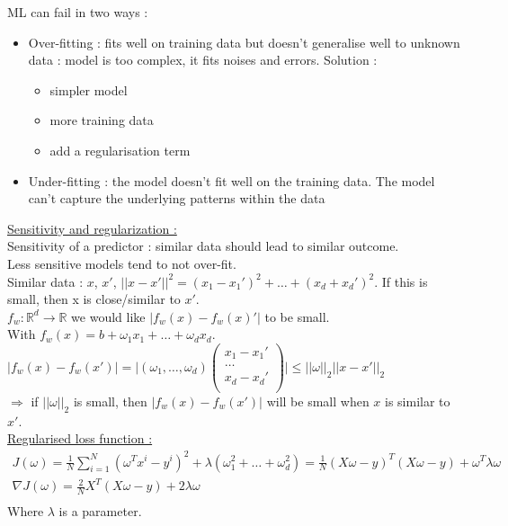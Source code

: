 \documentclass[../main.tex]{subfiles}
\begin{document}
ML can fail in two ways : \begin{itemize}
    \item Over-fitting : fits well on training data but doesn't generalise well to unknown data : model is too complex, it fits noises and errors. Solution : \begin{itemize}
        \item simpler model\\
        \item more training data\\
        \item add a regularisation term\\
    \end{itemize}
    \item Under-fitting : the model doesn't fit well on the training data. The model can't capture the underlying patterns within the data\\
\end{itemize}

\quad \underline{Sensitivity and regularization :}\\
Sensitivity of a predictor : similar data should lead to similar outcome.\\
Less sensitive models tend to not over-fit.\\
Similar data : $x$, $x'$, $\lvert \lvert x-x'\rvert \rvert^2 = (x_1-x_1')^2+ \dots + (x_d+x_d')^2$. If this is small, then x is close/similar to $x'$. \\
$f_w : \mathbb{R}^d\rightarrow \mathbb{R}$ we would like $\lvert f_w(x) - f_w(x)'\rvert$ to be small.\\
With $f_w(x) = b+\omega_1x_1 + \dots + \omega_dx_d$.\\
$\lvert f_w(x) - f_w(x')\rvert = \lvert (\omega_1, \dots, \omega_d) \begin{pmatrix}
    x_1-x_1'\\ \dots \\ x_d-x_d'\\
\end{pmatrix} \rvert \leq \lvert \lvert\omega \rvert \rvert_2 \lvert \lvert x-x'\rvert \rvert_2$\\
$\Rightarrow$ if $\lvert \lvert \omega\rvert \rvert_2$ is small, then $\lvert f_w(x)-f_w(x')\rvert$ will be small when $x$ is similar to $x'$.\\

\quad \underline{Regularised loss function :}\\
\begin{equation}
\begin{gathered}
    J(\omega) = \frac{1}{N} \sum_{i=1}^N (\omega^T x^i-y^i)^2+ \lambda(\omega_1^2+\dots + \omega_d^2) = \frac{1}{N} (X\omega-y)^T(X\omega -y) + \omega^T \lambda \omega\\
    \nabla J(\omega) = \frac{2}{N} X^T(X\omega-y)+2\lambda \omega\\
    \end{gathered}
\end{equation}
Where $\lambda$ is a parameter.
\end{document}
